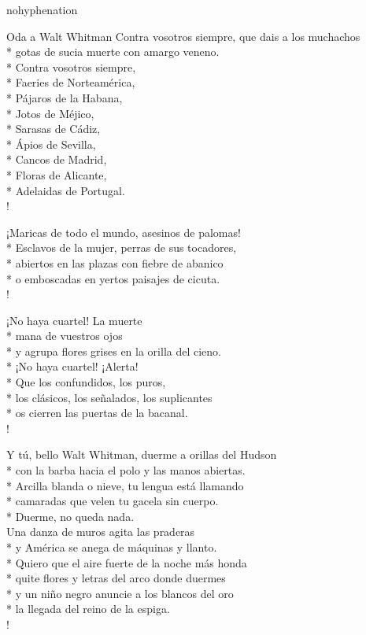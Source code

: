 \documentclass[
    a5paper,
    DIV=10,
    12pt,
    notitlepage,
    oneside,]
{scrbook} %
\begin{document}
\begin{hyphenrules}{nohyphenation}
\begin{poem}{Oda a Walt Whitman}{}{\vspace{-1em}}
Contra vosotros siempre, que dais a los muchachos\\*
gotas de sucia muerte con amargo veneno.\\*
Contra vosotros siempre,\\*
Faeries de Norteamérica,\\*
Pájaros de la Habana,\\*
Jotos de Méjico,\\*
Sarasas de Cádiz,\\*
Ápios de Sevilla,\\*
Cancos de Madrid,\\*
Floras de Alicante,\\*
Adelaidas de Portugal.\\!

¡Maricas de todo el mundo, asesinos de palomas!\\*
Esclavos de la mujer, perras de sus tocadores,\\*
abiertos en las plazas con fiebre de abanico\\*
o emboscadas en yertos paisajes de cicuta.\\!

¡No haya cuartel! La muerte\\*
mana de vuestros ojos\\*
y agrupa flores grises en la orilla del cieno.\\*
¡No haya cuartel! ¡Alerta!\\*
Que los confundidos, los puros,\\*
los clásicos, los señalados, los suplicantes\\*
os cierren las puertas de la bacanal.\\!

Y tú, bello Walt Whitman, duerme a orillas del Hudson\\*
con la barba hacia el polo y las manos abiertas.\\*
Arcilla blanda o nieve, tu lengua está llamando\\*
camaradas que velen tu gacela sin cuerpo.\\*
Duerme, no queda nada.\\

Una danza de muros agita las praderas\\*
y América se anega de máquinas y llanto.\\*
Quiero que el aire fuerte de la noche más honda\\*
quite flores y letras del arco donde duermes\\*
y un niño negro anuncie a los blancos del oro\\*
la llegada del reino de la espiga.\\!


\end{poem}
\end{hyphenrules}
\end{document}
